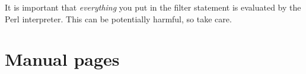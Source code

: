 \documentclass[11pt]{article}
\begin{document}
It is important that \emph{everything} you put in the filter statement is
evaluated by the Perl interpreter. This can be potentially harmful, so take
care.

\clearpage


\sf \small

\normalfont
\normalsize

\newpage


\appendix

\section{Manual pages}
\label{sec:manual-pages}


\end{document}
